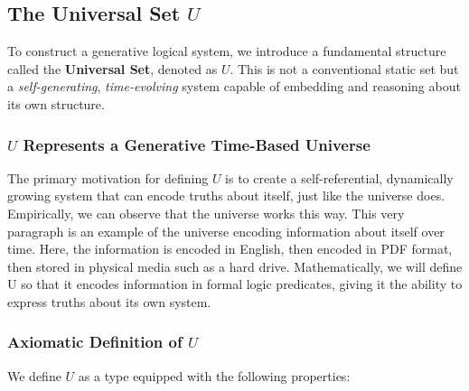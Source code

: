 \documentclass[12pt]{article}
\begin{document}
\subsection{The Universal Set \( U \)}

To construct a generative logical system, we introduce a fundamental structure called the \textbf{Universal Set}, denoted as \( U \). This is not a conventional static set but a \textit{self-generating}, \textit{time-evolving} system capable of embedding and reasoning about its own structure.

\subsubsection{\(U\) Represents a Generative Time-Based Universe}
The primary motivation for defining $U$ is to create a self-referential, dynamically growing system that can encode truths about itself, just like the universe does. Empirically, we can observe that the universe works this way. This very paragraph is an example of the universe encoding information about itself over time. Here, the information is encoded in English, then encoded in PDF format, then stored in physical media such as a hard drive. Mathematically, we will define U so that it encodes information in formal logic predicates, giving it the ability to express truths about its own system.

\subsubsection{Axiomatic Definition of \( U \)}

We define \( U \) as a type equipped with the following properties:
\end{document}
